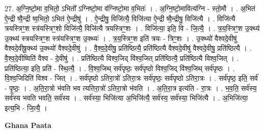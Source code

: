 \documentclass[17pt]{extarticle}
\begin{document}
27. अ॒ग्नि॒ष्टो॒मा व॒भितो॒ ऽभितो᳚ ऽग्निष्टो॒मा व॑ग्निष्टो॒मा व॒भितः॑ । . अ॒ग्नि॒ष्टो॒मावित्य॑ग्नि - स्तो॒मौ । . अ॒भित॑ ऐ॒न्द्री ष्वै॒न्द्री ष्व॒भितो॒ ऽभित॑ ऐ॒न्द्रीषु॑ । . ऐ॒न्द्रीषु॒ विजि॑त्यै॒ विजि॑त्या ऐ॒न्द्री ष्वै॒न्द्रीषु॒ विजि॑त्यै । . विजि॑त्यै त्रयस्त्रिꣳ॒॒श स्त्र॑यस्त्रिꣳ॒॒शो विजि॑त्यै॒ विजि॑त्यै त्रयस्त्रिꣳ॒॒शः । . विजि॑त्या॒ इति॒ वि - जि॒त्यै॒ । . त्र॒य॒स्त्रिꣳ॒॒श उ॒क्थ्य॑ उ॒क्थ्य॑ स्त्रयस्त्रिꣳ॒॒श स्त्र॑यस्त्रिꣳ॒॒श उ॒क्थ्यः॑ । . त्र॒य॒स्त्रिꣳ॒॒श इति॑ त्रयः - त्रिꣳ॒॒शः । . उ॒क्थ्यो॑ वैश्वदे॒वीषु॑ वैश्वदे॒वीषू॒क्थ्य॑ उ॒क्थ्यो॑ वैश्वदे॒वीषु॑ । . वै॒श्व॒दे॒वीषु॒ प्रति॑ष्ठित्यै॒ प्रति॑ष्ठित्यै वैश्वदे॒वीषु॑ वैश्वदे॒वीषु॒ प्रति॑ष्ठित्यै । . वै॒श्व॒दे॒वीष्विति॑ वैश्व - दे॒वीषु॑ । . प्रति॑ष्ठित्यै विश्व॒जिद् वि॑श्व॒जित् प्रति॑ष्ठित्यै॒ प्रति॑ष्ठित्यै विश्व॒जित् । . प्रति॑ष्ठित्या॒ इति॒ प्रति॑ - स्थि॒त्यै॒ । . वि॒श्व॒जिथ् सर्व॑पृष्ठः॒ सर्व॑पृष्ठो विश्व॒जिद् वि॑श्व॒जिथ् सर्व॑पृष्ठः । . वि॒श्व॒जिदिति॑ विश्व - जित् । . सर्व॑पृष्ठो ऽतिरा॒त्रो॑ ऽतिरा॒त्रः सर्व॑पृष्ठः॒ सर्व॑पृष्ठो ऽतिरा॒त्रः । . सर्व॑पृष्ठ॒ इति॒ सर्व॑ - पृ॒ष्ठः॒ । . अ॒ति॒रा॒त्रो भ॑वति भव त्यतिरा॒त्रो॑ ऽतिरा॒त्रो भ॑वति । . अ॒ति॒रा॒त्र इत्य॑ति - रा॒त्रः । . भ॒व॒ति॒ सर्व॑स्य॒ सर्व॑स्य भवति भवति॒ सर्व॑स्य । . सर्व॑स्या॒ भिजि॑त्या अ॒भिजि॑त्यै॒ सर्व॑स्य॒ सर्व॑स्या॒ भिजि॑त्यै । . अ॒भिजि॑त्या॒ इत्य॒भि - जि॒त्यै॒ । \newline

\textbf{Ghana Paata } \newline
\end{document}
